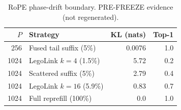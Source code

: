 \begin{table}[t]
\centering
\caption{RoPE phase-drift boundary. PRE-FREEZE evidence (not regenerated).}
\label{tab:physics}
\begin{tabular}{rlrr}
\toprule
$P$ & Strategy & KL (nats) & Top-1 \\
\midrule
256 & Fused tail suffix (5\%) & 0.0076 & 1.0 \\
1024 & LegoLink $k{=}4$ (1.5\%) & 5.72 & 0.2 \\
1024 & Scattered suffix (5\%) & 2.79 & 0.4 \\
1024 & LegoLink $k{=}16$ (5.9\%) & 0.83 & 0.7 \\
1024 & Full reprefill (100\%) & 0.0 & 1.0 \\
\bottomrule
\end{tabular}
\end{table}

